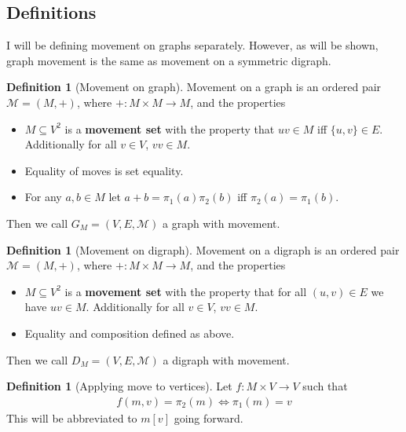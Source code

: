 \documentclass{article}
\theoremstyle{plain}
\theoremstyle{definition}
\newtheorem{definition}[theorem]{Definition}
\begin{document}
\subsection{Definitions}
I will be defining movement on graphs separately. However, as will be shown, 
graph movement is the same as movement on a symmetric digraph.
\begin{definition}[Movement on graph]\label{def graph movement}
	Movement on a graph is an ordered pair $\mathcal{M} = (M,+)$, where
	$+:M\times M \rightarrow M$, and the properties
	\begin{itemize}
		\item $M \subseteq V^2$ is a \textbf{movement set} with the property
			that $uv \in M$ iff $\{u,v\} \in E$. Additionally for
			all $v \in V$, $vv\in M$.
		\item Equality of moves is set equality.
		\item For any $a,b\in M$ let $a+b = \pi_1(a)\pi_2(b)$ iff
			$\pi_2(a) = \pi_1(b)$.
	\end{itemize}
	Then we call $G_M=(V,E,\mathcal{M})$ a graph with movement.
\end{definition}
\begin{definition}[Movement on digraph]\label{def digraph movement}
	Movement on a digraph is an ordered pair $\mathcal{M} = (M,+)$, where
	$+:M\times M \rightarrow M$, and the properties
	\begin{itemize}
		\item $M \subseteq V^2$ is a \textbf{movement set} with the property
			that for all $(u,v) \in E$ we have $uv \in M$. Additionally for
			all $v \in V$, $vv\in M$.
		\item Equality and composition defined as above.
	\end{itemize}
	Then we call $D_M=(V,E,\mathcal{M})$ a digraph with movement.
\end{definition}
\begin{definition}[Applying move to vertices]\label{def apply movement}
	Let $f: M \times V \rightarrow V$ such that 
	\begin{equation}
	\begin{aligned}
		f(m,v) = \pi_2(m) \Leftrightarrow \pi_1(m) = v
	\end{aligned}
	\end{equation}
	This will be abbreviated to $m[v]$ going forward.
\end{definition}
\newpage
\end{document}
